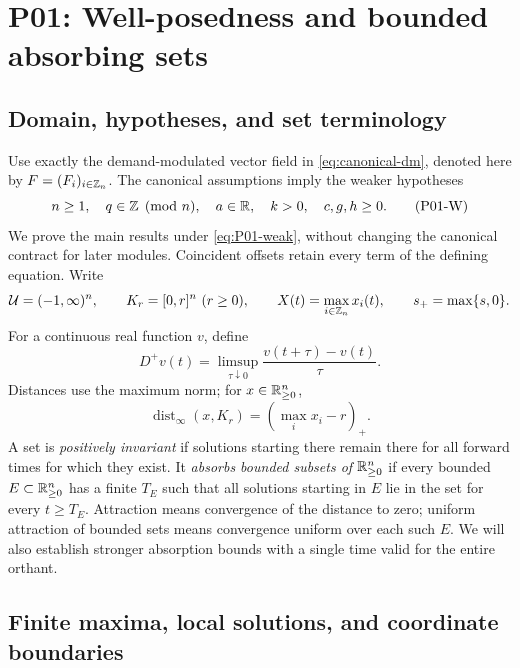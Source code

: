 \section{P01: Well-posedness and bounded absorbing sets}
\label{sec:P01}

\subsection{Domain, hypotheses, and set terminology}
Use exactly the demand-modulated vector field in
\eqref{eq:canonical-dm}, denoted here by $F=(F_i)_{i\in\mathbb{Z}_n}$.
The canonical assumptions imply the weaker hypotheses
\begin{equation}
\label{eq:P01-weak}
 n\ge1,\quad q\in\mathbb{Z}\pmod n,\quad
 a\in\mathbb{R},\quad k>0,\quad c,g,h\ge0.
\tag{P01-W}
\end{equation}
We prove the main results under \eqref{eq:P01-weak}, without changing the
canonical contract for later modules. Coincident offsets retain every
term of the defining equation. Write
\[
 \Domain=(-1,\infty)^n,\qquad K_r=[0,r]^n\ (r\ge0),\qquad
 X(t)=\max_{i\in\Zn}x_i(t),\qquad s_+=\max\{s,0\}.
\]
For a continuous real function $v$, define
\[
 D^+v(t)=\limsup_{\tau\downarrow0}
             \frac{v(t+\tau)-v(t)}{\tau}.
\]
Distances use the maximum norm; for $x\in\mathbb{R}_{\geq 0}^{n}$,
\begin{equation}
\label{eq:P01-distance}
 \operatorname{dist}_\infty(x,K_r)=(\max_i x_i-r)_+.
\end{equation}
A set is \emph{positively invariant} if solutions starting there remain
there for all forward times for which they exist. It \emph{absorbs bounded
subsets of $\mathbb{R}_{\geq 0}^{n}$} if every bounded $E\subset\mathbb{R}_{\geq 0}^{n}$ has a finite $T_E$
such that all solutions starting in $E$ lie in the set for every
$t\ge T_E$. Attraction means convergence of the distance to zero;
uniform attraction of bounded sets means convergence uniform over each
such $E$. We will also establish stronger absorption bounds with a
single time valid for the entire orthant.

\subsection{Finite maxima, local solutions, and coordinate boundaries}
\label{slot:P01-1}

